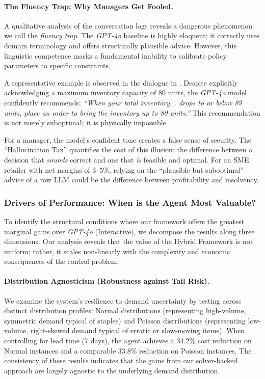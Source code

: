 \vspace{.5em}

\paragraph{The Fluency Trap: Why Managers Get Fooled.}
A qualitative analysis of the conversation logs reveals a dangerous phenomenon we call the \emph{fluency trap}. The \emph{GPT-4o} baseline is highly eloquent; it correctly uses domain terminology and offers structurally plausible advice. However, this linguistic competence masks a fundamental inability to calibrate policy parameters to specific constraints.

A representative example is observed in the dialogue in . Despite explicitly acknowledging a maximum inventory capacity of $80$ units, the \emph{GPT-4o} model confidently recommends: \emph{``When your total inventory... drops to or below 89 units, place an order to bring the inventory up to 80 units.''} 
This recommendation is not merely suboptimal; it is physically impossible. 

For a manager, the model's confident tone creates a false sense of security. The ``Hallucination Tax'' quantifies the cost of this illusion: the difference between a decision that \emph{sounds} correct and one that \emph{is} feasible and optimal. For an SME retailer with net margins of $3$--$5\%$, relying on the ``plausible but suboptimal'' advice of a raw LLM could be the difference between profitability and insolvency.






\subsubsection{Drivers of Performance: When is the Agent Most Valuable?}
\label{sec:driver}

To identify the structural conditions where our framework offers the greatest marginal gains over \emph{GPT-4o} (Interactive), we decompose the results along three dimensions. Our analysis reveals that the value of the Hybrid Framework is not uniform; rather, it scales non-linearly with the complexity and economic consequences of the control problem. \vspace{.5em}


\paragraph{Distribution Agnosticism (Robustness against Tail Risk).}
We examine the system's resilience to demand uncertainty by testing across distinct distribution profiles: Normal distributions (representing high-volume, symmetric demand typical of staples) and Poisson distributions (representing low-volume, right-skewed demand typical of erratic or slow-moving items). 
%
When controlling for lead time (7 days), the agent achieves a $34.2\%$ cost reduction on Normal instances and a comparable $33.8\%$ reduction on Poisson instances. The consistency of these results indicates that the gains from our solver-backed approach are largely agnostic to the underlying demand distribution. 

